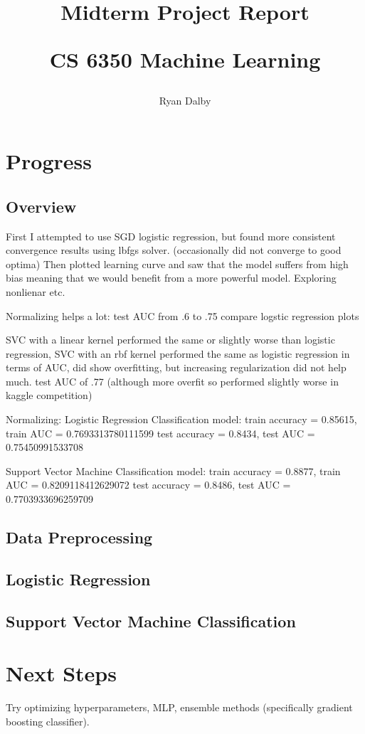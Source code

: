 \documentclass[11pt]{article}
\title{
    Midterm Project Report

    \large{
    CS 6350 Machine Learning
    }  
    
}
\author{
    Ryan Dalby
}
\date{\displaydate{date}}
\begin{document}
\maketitle

\section*{Progress}
\subsection*{Overview}









First I attempted to use SGD logistic regression, but found more consistent convergence results using lbfgs solver. (occasionally did not converge to good optima)
Then plotted learning curve and saw that the model suffers from high bias meaning that we would benefit from a more powerful model. Exploring nonlienar etc.

Normalizing helps a lot: 
test AUC from .6 to .75
compare logstic regression plots

SVC with a linear kernel performed the same or slightly worse than logistic regression, 
SVC with an rbf kernel performed the same as logistic regression in terms of AUC, did show overfitting, but increasing regularization did not help much.
test AUC of .77 (although more overfit so performed slightly worse in kaggle competition)



Normalizing: Logistic Regression Classification model: train accuracy = 0.85615, train AUC = 0.7693313780111599 
test accuracy = 0.8434, test AUC = 0.75450991533708

Support Vector Machine Classification model: train accuracy = 0.8877, train AUC = 0.8209118412629072 
test accuracy = 0.8486, test AUC = 0.7703933696259709

\subsection*{Data Preprocessing}
\subsection*{Logistic Regression}
\subsection*{Support Vector Machine Classification}

\section*{Next Steps}
Try optimizing hyperparameters, MLP, ensemble methods (specifically gradient boosting classifier).



% 
% 
\end{document}
